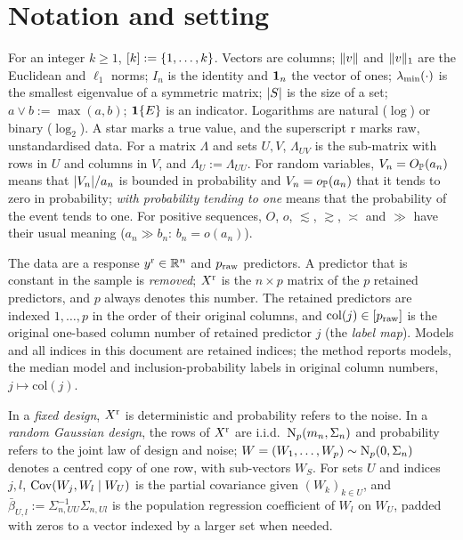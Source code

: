 \section{Notation and setting}\label{sec:setup}

\begin{definition}\label{def:notation}
For an integer $k\ge1$, $[k]:=\{1,\dots,k\}$. Vectors are columns; $\lVert v\rVert$ and $\lVert v\rVert_1$ are the Euclidean and
$\ell_1$ norms; $I_n$ is the identity and $\mathbf{1}_n$ the vector of ones; $\lambda_{\min}(\cdot)$ is the smallest eigenvalue of a
symmetric matrix; $\lvert S\rvert$ is the size of a set; $a\vee b:=\max(a,b)$; $\mathbf{1}\{E\}$ is an indicator. Logarithms are natural
($\log$) or binary ($\log_2$). A star marks a true value, and the superscript $\mathrm r$ marks raw, unstandardised data.
For a matrix $\Lambda$ and sets $U,V$, $\Lambda_{UV}$ is the sub-matrix with rows in $U$ and columns in $V$, and
$\Lambda_U:=\Lambda_{UU}$. For random variables, $V_n=O_{\mathbb{P}}(a_n)$ means that $\lvert V_n\rvert/a_n$ is bounded in probability and
$V_n=o_{\mathbb{P}}(a_n)$ that it tends to zero in probability; \emph{with probability tending to one} means that the probability of
the event tends to one. For positive sequences, $O$, $o$, $\lesssim$, $\gtrsim$, $\asymp$ and $\gg$ have their usual
meaning ($a_n\gg b_n$: $b_n=o(a_n)$).
\end{definition}

\begin{definition}\label{def:data}
The data are a response $y^{\mathrm r}\in\mathbb{R}^n$ and $p_{\mathrm{raw}}$ predictors. A predictor that is constant in the sample is
\emph{removed}; $X^{\mathrm r}$ is the $n\times p$ matrix of the $p$ retained predictors, and $p$ always denotes this number.
The retained predictors are indexed $1,\dots,p$ in the order of their original columns, and $\mathrm{col}(j)\in[p_{\mathrm{raw}}]$ is the
original one-based column number of retained predictor $j$ (the \emph{label map}). Models and all indices in this
document are retained indices; the method reports models, the median model and inclusion-probability labels in original
column numbers, $j\mapsto\mathrm{col}(j)$.
\end{definition}

\begin{definition}[Designs]\label{def:designs}
In a \emph{fixed design}, $X^{\mathrm r}$ is deterministic and probability refers to the noise. In a \emph{random Gaussian design},
the rows of $X^{\mathrm r}$ are i.i.d.\ $\mathrm{N}_p(m_n,\Sigma_n)$ and probability refers to the joint law of design and noise;
$W=(W_1,\dots,W_p)\sim\mathrm{N}_p(0,\Sigma_n)$ denotes a centred copy of one row, with sub-vectors $W_S$. For sets $U$ and
indices $j,l$, $\operatorname{Cov}(W_j,W_l\mid W_U)$ is the partial covariance given $(W_k)_{k\in U}$, and
$\bar\beta_{U,l}:=\Sigma_{n,UU}^{-1}\Sigma_{n,Ul}$ is the population regression coefficient of $W_l$ on $W_U$, padded
with zeros to a vector indexed by a larger set when needed.
\end{definition}

